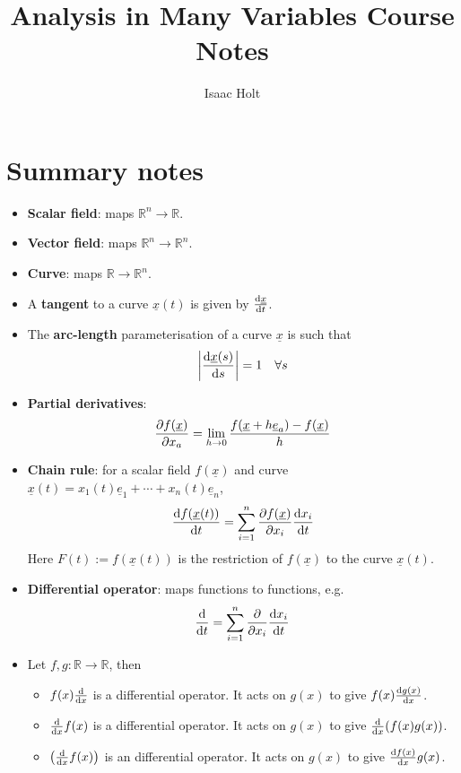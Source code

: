 

\title{Analysis in Many Variables Course Notes}
\author{Isaac Holt}





\section{Summary notes}

\begin{itemize}
	\item \textbf{Scalar field}: maps $\mathbb{R}^n \rightarrow \mathbb{R}$.
	\item \textbf{Vector field}: maps $\mathbb{R}^n \rightarrow \mathbb{R}^n$.
	\item \textbf{Curve}: maps $\mathbb{R} \rightarrow \mathbb{R}^n$.
	\item A \textbf{tangent} to a curve $\underline{x}(t)$ is given by $\diff{\underline{x}}{t}$.
	\item The \textbf{arc-length} parameterisation of a curve $\underline{x}$ is such that
	\[
		\left| \diff{\underline{x}(s)}{s} \right| = 1 \quad \forall s
	\]
	\item \textbf{Partial derivatives}:
	\[
		\diffp{f(\underline{x})}{x_a} = \lim_{h \rightarrow 0}{\frac{f(\underline{x} + h\underline{e}_a) - f(\underline{x})}{h}}
	\]
	\item \textbf{Chain rule}: for a scalar field $f(\underline{x})$ and curve $\underline{x}(t) = x_1(t) \underline{e}_1 + \cdots + x_n(t) \underline{e}_n$,
	\[
		\diff{f(\underline{x}(t))}{t} = \sum_{i = 1}^n \diffp{f(\underline{x})}{x_i} \diff{x_i}{t}
	\]
	Here $F(t) := f(\underline{x}(t))$ is the restriction of $f(\underline{x})$ to the curve $\underline{x}(t)$.
	\item \textbf{Differential operator}: maps functions to functions, e.g.
	\[
		\diff{}{t} = \sum_{i = 1}^n \diffp{}{x_i} \diff{x_i}{t}
	\]
	\item Let $f, g: \mathbb{R} \to \mathbb{R}$, then
	\begin{itemize}
		\item $f(x) \diff{}{x}$ is a differential operator. It acts on $g(x)$ to give $f(x) \diff{g(x)}{x}$.
		\item $\diff{}{x} f(x)$ is a differential operator. It acts on $g(x)$ to give $\diff{}{x} (f(x) g(x))$.
		\item $\left( \diff{}{x} f(x) \right)$ is an differential operator. It acts on $g(x)$ to give $\diff{f(x)}{x} g(x)$.

\end{itemize}
\end{itemize}
